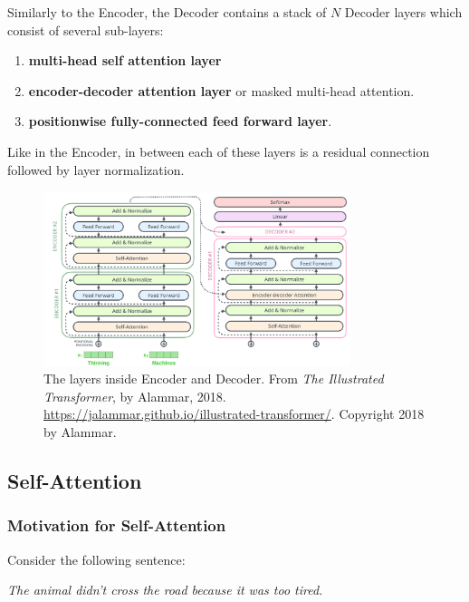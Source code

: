 Similarly to the Encoder, the Decoder contains a stack of $N$ Decoder layers which consist of several sub-layers:
\begin{enumerate}
    \item \textbf{multi-head self attention layer}
    \item \textbf{encoder-decoder attention layer} or masked multi-head attention. 
    
    \item \textbf{positionwise fully-connected feed forward layer}. 
\end{enumerate}

Like in the Encoder, in between each of these layers is a residual connection followed by layer normalization. 

\begin{figure}[h]
\vspace{-10pt}
\centering
\includegraphics[width=0.8\textwidth]{imgs/encoderDecoderLayersDetailed.png}
\vspace{-10pt}
\caption{\footnotesize The layers inside Encoder and Decoder. From \emph{The Illustrated Transformer}, by Alammar, 2018. \url{https://jalammar.github.io/illustrated-transformer/}. Copyright 2018 by Alammar.}
\vspace{-5pt}
\end{figure}



\subsection{Self-Attention}

\subsubsection{Motivation for Self-Attention}

Consider the following sentence: 


\begin{shadequote}{}
\vspace{10pt}
\Large \textit{The animal didn't cross the road because it was too tired.}
\vspace{10pt}
\end{shadequote}

